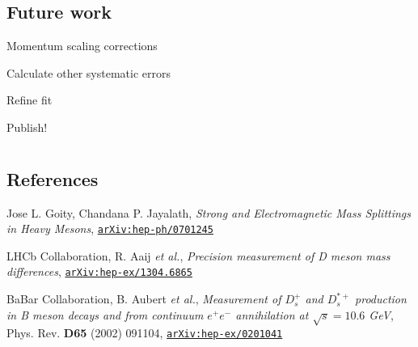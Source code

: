 \documentclass{beamer}%
\begin{document}
\subsection{Future work}
  \begin{frame}
\begin{itemize}
\setlength\itemsep{1.5em}
{\LARGE
\item Momentum scaling corrections
\item Calculate other systematic errors
\item Refine fit
\item Publish!
}
\end{itemize}
  \end{frame}


\section*{}
\subsection*{References}
\begin{frame}
\begin{thebibliography}{3}

Jose L. Goity, Chandana P. Jayalath,
\textit{Strong and Electromagnetic Mass Splittings in Heavy Mesons},
\href{https://arxiv.org/pdf/hep-ph/0701245.pdf}{\texttt{arXiv:hep-ph/0701245}}

LHCb Collaboration, R. Aaij \textit{et al.},
\textit{Precision measurement of D meson mass differences},
\href{https://arxiv.org/pdf/1304.6865.pdf}{\texttt{arXiv:hep-ex/1304.6865}}

BaBar Collaboration, B. Aubert \textit{et al.},
\textit{Measurement of $D^+_s$ and $D^{*+}_s$ production in B meson decays and from continuum $e^+e^-$ annihilation at $\sqrt{s} = 10.6$ GeV},
Phys. Rev. \textbf{D65} (2002) 091104, \href{https://arxiv.org/pdf/hep-ex/0201041.pdf}{\texttt{arXiv:hep-ex/0201041}}

\end{thebibliography}
\end{frame}
\end{document}
